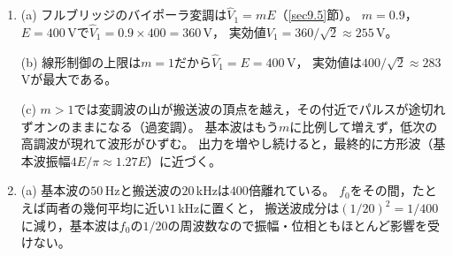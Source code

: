 \begin{enumerate}
(c) 
\begin{equation*}
\mathit{\Delta}t = \frac{2 \times 0.795}{2\pi/T} \approx 0.253\,T
\end{equation*}

(d) 
\begin{equation*}
A_n = \frac{2E}{\pi n}\sin n\omega\mathit{\Delta}t,\qquad
B_n = \frac{2E}{\pi n}\left(1 + \cos n\omega\mathit{\Delta}t\right) = \frac{4E}{\pi n}\cos^2\frac{n\omega\mathit{\Delta}t}{2}
\end{equation*}
\begin{equation*}
A_n^2 + B_n^2 = \left(\frac{4E}{\pi n}\right)^{2}\left(\sin^2 x\cos^2 x + \cos^4 x\right)
= \left(\frac{4E}{\pi n}\right)^{2}\cos^2 x
\end{equation*}

\item[\ref{ex9.5}]
(a) フルブリッジのバイポーラ変調は$\hat{V}_1 = mE$（\ref{sec9.5}節）。
$m = 0.9$，$E = 400$\,Vで$\hat{V}_1 = 0.9\times400 = 360$\,V，
実効値$V_1 = 360/\sqrt{2} \approx 255$\,V。

(b) 線形制御の上限は$m = 1$だから$\hat{V}_1 = E = 400$\,V，
実効値は$400/\sqrt{2} \approx 283$\,Vが最大である。

(c) $m > 1$では変調波の山が搬送波の頂点を越え，その付近でパルスが途切れずオンのままになる（過変調）。
基本波はもう$m$に比例して増えず，低次の高調波が現れて波形がひずむ。
出力を増やし続けると，最終的に方形波（基本波振幅$4E/\pi \approx 1.27E$）に近づく。

\item[\ref{ex9.6}]
(a) 基本波の$50$\,Hzと搬送波の$20$\,kHzは$400$倍離れている。
$f_0$をその間，たとえば両者の幾何平均に近い$1$\,kHzに置くと，
搬送波成分は$(1/20)^2 = 1/400$に減り，基本波は$f_0$の$1/20$の周波数なので振幅・位相ともほとんど影響を受けない。


\end{enumerate}
